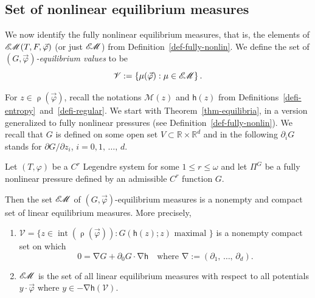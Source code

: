 \documentclass[AHL, Unicode, longabstracts,published]{cedram}
\theoremstyle{plain}
\theoremstyle{plain}
\newcommand\vpot{\vec\pot}
\DeclareMathOperator{\interior}{int}
\newcommand{\rs}{\operatorname{\rho}}
\newcommand{\grad}{\operatorname{\nabla}}
\newcommand{\hf}{\mathsf{h}}
\newcommand{\EM}{\mathscr{E\kern-2pt M}}
\newcommand{\pot}{\varphi}
\newcommand*\8{\infty}
\newcommand*\R{\mathbb{R}}
\newcommand{\cM}{\mathcal{M}}
\newcommand{\scV}{\mathscr{V}}
\newcommand*{\romanenumi}{\renewcommand*{\theenumi}{\roman{enumi}}}
\begin{document}
\subsection{Set of nonlinear equilibrium measures}


We now identify the fully nonlinear equilibrium measures, that is, the elements of $\EM(T,F,\vpot)$ (or just $\EM$) from Definition~\ref{def-fully-nonlin}. We define the set of \emph{$(G,\vpot)$-equilibrium values} to be
\[
\scV:=\left\{\mu(\vpot):\mu\in\EM\right\}.
\]

For $ z\in \rs(\vpot)$, recall the notations $\cM(z)$ and $\hf(z)$ from Definitions~\ref{defi-entropy}~and~\ref{defi-regular}. We start with Theorem~\ref{thm-equilibria}, in a version generalized to fully nonlinear pressures (see Definition~\ref{def-fully-nonlin}). We recall that $G$ is defined on some open set $V\subset \R\times \R^{d}$ and in the following $\partial_{i}G$ stands for $\partial G/\partial z_{i}$, $i=0,1,\,\ldots,\,d$.

\begin{theo}\label{thm:equilibria-G}
Let $(T, \pot)$ be a {$C^r$ Legendre system} for some $1\leq r\leq\omega$ and let $\Pi^G$ be a fully nonlinear pressure defined by an admissible $C^r$ function $G$.

Then the set $\EM$ of $(G,\vpot)$-equilibrium measures is a nonempty and compact set of linear equilibrium measures. More precisely,
\begin{enumerate}\romanenumi
\item\label{enumi:equilibria-G-i}
$\scV = \{ z\in\interior(\rs(\vpot)):G(\hf(z); z)\text{ maximal }\}$ is a nonempty compact set on which
\begin{equation}\label{eq-gradg}
0 = \grad G + \partial_{0} G \cdot \grad \hf \quad \text{where } \grad := \left(\partial_1,\,\dots,\,\partial_d\right).
\end{equation}
\item\label{enumi:equilibria-G-ii}
$ \EM$ is the set of all linear equilibrium measures with respect to all potentials $y\cdot\vec\pot$ where $y \in -\grad \hf(\scV)$.
\end{enumerate}
\end{theo}
\end{document}
